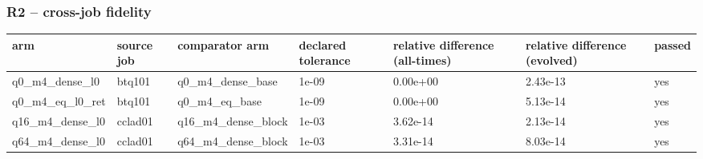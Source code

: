 \documentclass[11pt]{article}
\begin{document}
\subsubsection{R2 -- cross-job fidelity}
\begin{table}[htbp]\centering\small
\begin{tabular}{lllllll}\hline
arm & source job & comparator arm & declared tolerance & relative difference (all-times) & relative difference (evolved) & passed \\ \hline
q0\_m4\_dense\_l0 & btq101 & q0\_m4\_dense\_base & 1e-09 & 0.00e+00 & 2.43e-13 & yes \\
q0\_m4\_eq\_l0\_ret & btq101 & q0\_m4\_eq\_base & 1e-09 & 0.00e+00 & 5.13e-14 & yes \\
q16\_m4\_dense\_l0 & cclad01 & q16\_m4\_dense\_block & 1e-03 & 3.62e-14 & 2.13e-14 & yes \\
q64\_m4\_dense\_l0 & cclad01 & q64\_m4\_dense\_block & 1e-03 & 3.31e-14 & 8.03e-14 & yes \\
\hline\end{tabular}
\end{table}
\end{document}
